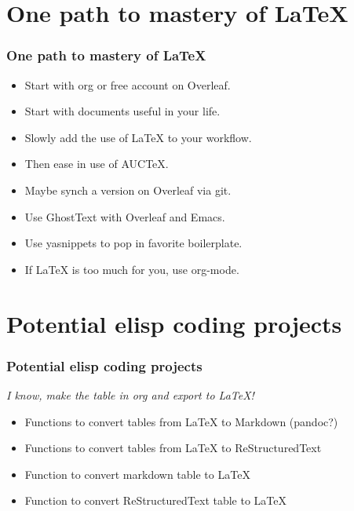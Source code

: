 \documentclass{beamer}
\begin{document}
\section{One path to mastery of \LaTeX}
\begin{frame}
\frametitle{One path to mastery of \LaTeX }
\begin{center}
\begin{Large}
\begin{itemize}[font=$\bullet$\scshape\bfseries]
\item Start with org or free account on Overleaf.
\item Start with documents useful in your life.
\item Slowly add the use of \LaTeX{} to your workflow.
\item Then ease in use of AUCTeX.
\item Maybe synch a version on Overleaf via git.
\item Use GhostText with Overleaf and Emacs.
\item Use yasnippets to pop in favorite boilerplate.
\item If \LaTeX{} is too much for you, use org-mode.
\end{itemize}
\end{Large}
\end{center}
\end{frame}


\section{Potential elisp coding projects}
\begin{frame}
\frametitle{Potential elisp coding projects}
\begin{center}
\begin{Large}
\emph{I know, make the table in org and export to LaTeX!}
\begin{itemize}[font=$\bullet$\scshape\bfseries]
\item Functions to convert tables from LaTeX to Markdown (pandoc?)
\item Functions to convert tables from LaTeX to ReStructuredText
\item Function to convert markdown table to LaTeX
\item Function to convert ReStructuredText table to LaTeX
\end{itemize}
\end{Large}
\end{center}
\end{frame}
\end{document}

